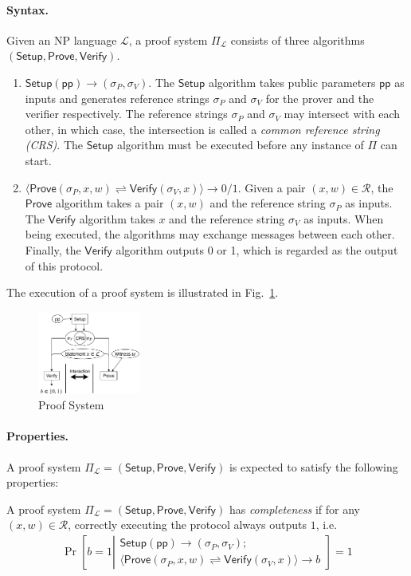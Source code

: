 \documentclass[acmtog]{acmart}
\newcommand{\cL}{\mathcal{L}}
\newcommand{\cR}{\mathcal{R}}
\newcommand{\Setup}{\mathsf{Setup}}
\newcommand{\Prove}{\mathsf{Prove}}
\newcommand{\Verify}{\mathsf{Verify}}
\newcommand{\pp}{\mathsf{pp}}
\newcommand{\PiL}{\Pi_{\cL}}
\begin{document}
\paragraph{Syntax.}
Given an NP language $\cL$, a proof system $\PiL$ consists of three algorithms $(\Setup,\Prove,\Verify)$.
\begin{enumerate}
	\item $\Setup(\pp)\to(\sigma_P,\sigma_V)$. The $\Setup$ algorithm takes public parameters $\pp$ as inputs and generates reference strings $\sigma_P$ and $\sigma_V$ for the prover and the verifier respectively.
	The reference strings $\sigma_P$ and $\sigma_V$ may intersect with each other, in which case, the intersection is called a \emph{common reference string (CRS)}.
	The $\Setup$ algorithm must be executed before any instance of $\Pi$ can start.
	\item $\langle\Prove(\sigma_P, x, w)\rightleftharpoons\Verify(\sigma_V, x)\rangle\to 0/1$.
	Given a pair $(x,w)\in\cR$, the $\Prove$ algorithm takes a pair $(x,w)$ and the reference string $\sigma_P$ as inputs.
	The $\Verify$ algorithm takes $x$ and the reference string $\sigma_V$ as inputs.
	When being executed, the algorithms may exchange messages between each other.
	Finally, the $\Verify$ algorithm outputs 0 or 1, which is regarded as the output of this protocol.
\end{enumerate}
The execution of a proof system is illustrated in Fig.~\ref{fig:proof.system}.
\begin{figure}[ht!]
\includegraphics[width=0.3\textwidth]{images/proof-system.pdf}
\caption{Proof System}
\label{fig:proof.system}
\Description{}
\end{figure}


\paragraph{Properties.}
A proof system $\PiL=(\Setup,\Prove,\Verify)$ is expected to satisfy the following properties:

\begin{definition}[Completeness]
\label{def:completeness}
A proof system $\PiL=(\Setup,\Prove,\Verify)$ has \emph{completeness} if for any $(x,w)\in\cR$, correctly executing the protocol always outputs $1$, i.e.
	\begin{eqnarray}
	\Pr\left[b=1\left|
	\begin{matrix}
	\Setup(\pp)\to(\sigma_P,\sigma_V);\\
	\langle\Prove(\sigma_P, x, w)\rightleftharpoons\Verify(\sigma_V, x)\rangle\to b
	\end{matrix}
	\right.\right]=1
	\end{eqnarray}
\end{definition}
\end{document}
